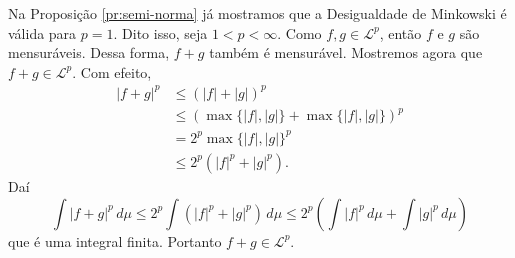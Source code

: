 \documentclass[a4paper, 11pt]{book}
\theoremstyle{definition}
\newcommand{\cL}{\mathcal{L}}
\begin{document}
\begin{prf}
    Na Proposição \ref{pr:semi-norma} já mostramos que a Desigualdade de Minkowski é válida para $p = 1$.
    Dito isso, seja $1 < p < \infty$.
    Como $f,g \in \cL^p$, então $f$ e $g$ são mensuráveis.
    Dessa forma, $f + g$ também é mensurável.
    Mostremos agora que $f + g \in \cL^p$.
    Com efeito,
    \[
        \begin{aligned}
            | f + g |^p &\leqslant (|f| + |g|)^p\\
            &\leqslant (\max\{|f|, |g|\} + \max\{|f|, |g|\})^p\\
            &= 2^p\max\{|f|, |g|\}^p\\
            &\leqslant 2^p (|f|^p + |g|^p).
        \end{aligned}
    \]
    Daí
    \[
        \int |f+g|^p \, d\mu \leqslant 2^p\int (|f|^p + |g|^p) \,d\mu \leqslant 2^p \left(\int |f|^p \,d\mu + \int |g|^p \,d\mu\right)
    \]
    que é uma integral finita.
    Portanto $f + g \in \cL^p$.


\end{prf}
\end{document}
